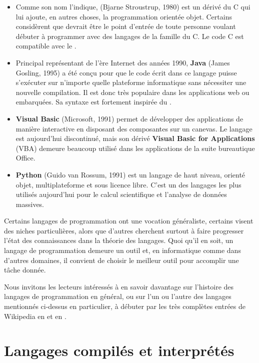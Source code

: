 \begin{itemize}
\item Comme son nom l'indique, \textbf{\Cpp} (Bjarne Stroustrup, 1980)
  est un dérivé du C qui lui ajoute, en autres choses, la
  programmation orientée objet. Certains considèrent que {\Cpp}
  devrait être le point d'entrée de toute personne voulant débuter à
  programmer avec des langages de la famille du C. Le code C est
  compatible avec le \Cpp.
\item Principal représentant de l'ère Internet des années 1990,
  \textbf{Java} (James Gosling, 1995) a été conçu pour que le code
  écrit dans ce langage puisse s'exécuter sur n'importe quelle
  plateforme informatique sans nécessiter une nouvelle compilation. Il
  est donc très populaire dans les applications web ou embarquées. Sa
  syntaxe est fortement inspirée du \Cpp.
\item \textbf{Visual Basic} (Microsoft, 1991) permet de développer des
  applications de manière interactive en disposant des composantes sur
  un canevas. Le langage est aujourd'hui discontinué, mais son dérivé
  \textbf{Visual Basic for Applications} (VBA) demeure beaucoup
  utilisé dans les applications de la suite bureautique Office.
\item \textbf{Python} (Guido van Rossum, 1991) est un langage de haut
  niveau, orienté objet, multiplateforme et sous licence libre. C'est
  un des langages les plus utilisés aujourd'hui pour le calcul
  scientifique et l'analyse de données massives.
\end{itemize}

Certains langages de programmation ont une vocation généraliste,
certains visent des niches particulières, alors que d'autres cherchent
surtout à faire progresser l'état des connaissances dans la théorie
des langages. Quoi qu'il en soit, un langage de programmation demeure
un outil et, en informatique comme dans d'autres domaines, il convient
de choisir le meilleur outil pour accomplir une tâche donnée.

Nous invitons les lecteurs intéressés à en savoir davantage sur
l'histoire des langages de programmation en général, ou sur l'un ou
l'autre des langages mentionnés ci-dessus en particulier, à débuter
par les très complètes entrées de Wikipedia en
et en
.


\section{Langages compilés et interprétés}
\label{sec:informatique:compile_vs_interprete}

